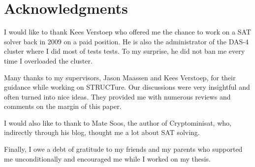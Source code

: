 \chapter*{Acknowledgments}
\thispagestyle{empty}

I would like to thank Kees Verstoep who offered me the chance to
work on a SAT solver back in 2009 on a paid position. He is also
the administrator of the DAS-4 cluster where I did most of tests
tests. To my surprise, he did not ban me every time I overloaded
the cluster.

Many thanks to my supervisors, Jason Maassen and Kees Verstoep, for
their guidance while working on STRUCTure. Our discussions were very
insightful and often turned into nice ideas. They provided me with
numerous reviews and comments on the margin of this paper.

I would also like to thank to Mate Soos, the author of Cryptominisat,
who, indirectly through his blog, thought me a lot about
SAT solving.

Finally, I owe a debt of gratitude to my friends and my parents
who supported me unconditionally and encouraged me while I worked
on my thesis.

\clearpage

